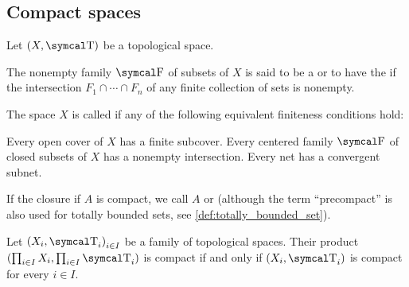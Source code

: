 \subsection{Compact spaces}\label{subsec:compact_spaces}

Let \( (X, \CT) \) be a topological space.

\begin{definition}\label{def:centered_family}\cite[123]{Engelking1989}
  The nonempty family \( \CF \) of subsets of \( X \) is said to be a  or to have the  if the intersection \( F_1 \cap \cdots \cap F_n \) of any finite collection of sets is nonempty.
\end{definition}

\begin{definition}\label{def:compact_space}\cite[123]{Engelking1989}
  The space \( X \) is called  if any of the following equivalent finiteness conditions hold:
  \begin{defenum}
     Every open cover of \( X \) has a finite subcover.
     Every centered family \( \CF \) of closed subsets of \( X \) has a nonempty intersection.
     Every net has a convergent subnet.
  \end{defenum}
\end{definition}

\begin{remark}\label{remark:precompact_set}
  If the closure if \( A \) is compact, we call \( A \)  or  (although the term \enquote{precompact} is also used for totally bounded sets, see \ref{def:totally_bounded_set}).
\end{remark}

\begin{theorem}\label{thm:tychonoffs_product_theorem}\cite[theorem 3.2.4]{Engelking1989}
  Let \( { (X_i, \CT_i) }_{i \in I} \) be a family of topological spaces. Their product \( (\prod_{i \in I} X_i, \prod_{i \in I} \CT_i) \) is compact if and only if \( (X_i, \CT_i) \) is compact for every \( i \in I \).

\end{theorem}


